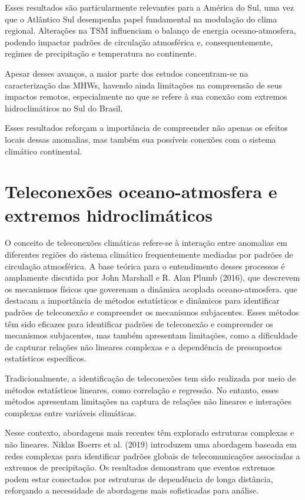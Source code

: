	Esses resultados são particularmente relevantes para a América do Sul, uma vez que o Atlântico Sul desempenha papel fundamental na modulação do clima regional. Alterações na TSM influenciam o balanço de energia oceano-atmosfera, podendo impactar padrões de circulação atmosférica e, consequentemente, regimes de precipitação e temperatura no continente.

	Apesar desses avanços, a maior parte dos estudos concentram-se na caracterização das MHWs, havendo ainda limitações na compreensão de seus impactos remotos, especialmente no que se refere à sua conexão com extremos hidroclimáticos no Sul do Brasil.

	Esses resultados reforçam a importância de compreender não apenas os efeitos locais dessas anomalias, mas também sua possíveis conexões com o sistema climático continental.

\section{Teleconexões oceano-atmosfera e extremos hidroclimáticos}\label{sec:teleconexoes}

	O conceito de teleconexões climáticas refere-se à interação entre anomalias em diferentes regiões do sistema climático frequentemente mediadas por padrões de circulação atmosférica. A base teórica para o entendimento desses processos é amplamente discutida por John Marshall e R. Alan Plumb (2016), que descrevem os mecanismos físicos que goverenam a dinâmica acoplada oceano-atmosfera. que destacam a importância de métodos estatísticos e dinâmicos para identificar padrões de teleconexão e compreender os mecanismos subjacentes. Esses métodos têm sido eficazes para identificar padrões de teleconexão e compreender os mecanismos subjacentes, mas também apresentam limitações, como a dificuldade de capturar relações não lineares complexas e a dependência de pressupostos estatísticos específicos.

	Tradicionalmente, a identificação de teleconexões tem sido realizada por meio de métodos estatísticos lineares, como correlação e regressão. No entanto, esses métodos apresentam limitações na captura de relações não lineares e interações complexas entre variáveis climáticas. 
	
	Nesse contexto, abordagens mais recentes têm explorado estruturas complexas e não lineares. Niklas Boerrs et al. (2019) introduzem uma abordagem baseada em redes complexas para identificar padrões globais de telecomunicações associadas a extremos de precipitação. Os resultados demonstram que eventos extremos podem estar conectados por estruturas de dependência de longa distância, reforçando a necessidade de abordagens mais sofisticadas para análise.
	

